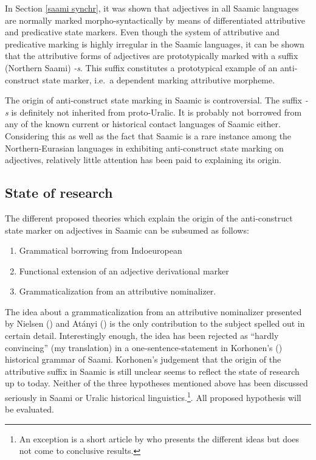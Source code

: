 {In Section \ref{saami synchr}, it was shown that adjectives in all Saamic languages are normally marked morpho-syntactically by means of differentiated attributive and predicative state markers. Even though the system of attributive and predicative marking is highly irregular in the Saamic languages, it can be shown that the attributive forms of adjectives are prototypically marked with a suffix (Northern Saami) \textit{-s}. This suffix constitutes a prototypical example of an anti-construct state marker, i.e.~a dependent marking attributive morpheme.

The origin of anti-construct state marking in Saamic is controversial. The suffix \textit{-s} is definitely not inherited from proto-Uralic. It is probably not borrowed from any of the known current or historical contact languages of Saamic either. Considering this as well as the fact that Saamic is a rare instance among the Northern-Eurasian languages in exhibiting anti-construct state marking on adjectives, relatively little attention has been paid to explaining its origin.

\subsection{State of research}

The different proposed theories which explain the origin of the anti-construct state marker on adjectives in Saamic can be subsumed as follows:
\begin{enumerate}
\item Grammatical borrowing from Indoeuropean
\item Functional extension of an adjective derivational marker
\item Grammaticalization from an attributive nominalizer.
\end{enumerate}

\noindent The idea about a grammaticalization from an attributive nominalizer presented by Nielsen (\citeyear{nielsen1933}) and Atányi (\citeyear{atanyi1942,atanyi1943}) is the only contribution to the subject spelled out in certain detail. Interestingly enough, the idea has been rejected as “hardly convincing” (my translation) in a one-sentence-statement in Korhonen's (\citeyear{korhonen-m1981}) historical grammar of Saami. Korhonen's judgement that the origin of the attributive suffix in Saamic is still unclear \cite[246]{korhonen-m1981} seems to reflect the state of research up to today. Neither of the three hypotheses mentioned above has been discussed seriously in Saami or Uralic historical linguistics.\footnote{An exception is a short article by \cite{sarv-m2001} who presents the different ideas but does not come to conclusive results.}. All proposed hypothesis will be evaluated.

}
